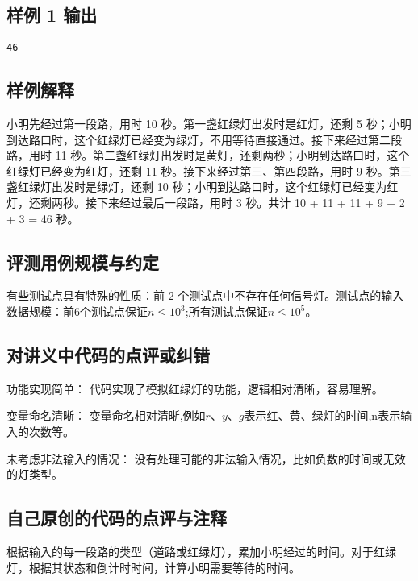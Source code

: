 \subsection{样例 1 输出}

\begin{lstlisting}[numbers=none]
46
\end{lstlisting}

\subsection{样例解释}

小明先经过第一段路，用时 10 秒。第一盏红绿灯出发时是红灯，还剩 5 秒；小明到达路口时，这个红绿灯已经变为绿灯，不用等待直接通过。接下来经过第二段路，用时 11 秒。第二盏红绿灯出发时是黄灯，还剩两秒；小明到达路口时，这个红绿灯已经变为红灯，还剩 11 秒。接下来经过第三、第四段路，用时 9 秒。第三盏红绿灯出发时是绿灯，还剩 10 秒；小明到达路口时，这个红绿灯已经变为红灯，还剩两秒。接下来经过最后一段路，用时 3 秒。共计 10 + 11 + 11 + 9 + 2 + 3 = 46 秒。

\subsection{评测用例规模与约定}

有些测试点具有特殊的性质：前 2 个测试点中不存在任何信号灯。测试点的输入数据规模：前6个测试点保证$n ≤ 10^3$;所有测试点保证$n ≤ 10^5$。

\subsection{对讲义中代码的点评或纠错}
 
功能实现简单： 代码实现了模拟红绿灯的功能，逻辑相对清晰，容易理解。

变量命名清晰： 变量命名相对清晰,例如$r、y、g$表示红、黄、绿灯的时间,n表示输入的次数等。

未考虑非法输入的情况： 没有处理可能的非法输入情况，比如负数的时间或无效的灯类型。

\subsection{自己原创的代码的点评与注释}

根据输入的每一段路的类型（道路或红绿灯），累加小明经过的时间。对于红绿灯，根据其状态和倒计时时间，计算小明需要等待的时间。

